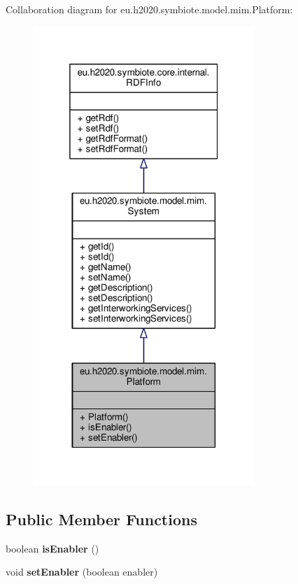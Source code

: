 Collaboration diagram for eu.\+h2020.\+symbiote.\+model.\+mim.\+Platform\+:
\nopagebreak
\begin{figure}[H]
\begin{center}
\leavevmode
\includegraphics[width=236pt]{classeu_1_1h2020_1_1symbiote_1_1model_1_1mim_1_1Platform__coll__graph}
\end{center}
\end{figure}
\subsection*{Public Member Functions}
\begin{DoxyCompactItemize}
\item 
\mbox{\label{classeu_1_1h2020_1_1symbiote_1_1model_1_1mim_1_1Platform_a6b05570638b9493352633a5a079c45ed}} 
boolean {\bfseries is\+Enabler} ()
\item 
\mbox{\label{classeu_1_1h2020_1_1symbiote_1_1model_1_1mim_1_1Platform_ac0c3c12bef4bf1a820d48b1a224cec34}} 
void {\bfseries set\+Enabler} (boolean enabler)
\end{DoxyCompactItemize}


